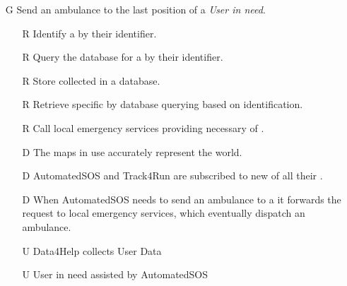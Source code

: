 \documentclass[../../../rasd.tex]{subfiles}
\begin{document}
\begin{itemize}
	\item[G\subs{7}]Send an ambulance to the last position of a \textit{User in need}.
	\begin{itemize}
		\item[R\subs{6}]Identify a  by their identifier.
		\item[R\subs{7}]Query the database for a  by their identifier.
		\item[R\subs{11}]Store collected  in a database.
		\item[R\subs{12}]Retrieve specific  by database querying based on  identification.
		\item[R\subs{38}]Call local emergency services providing necessary  of .
		\\
		\item[D\subs{3}]The maps in use accurately represent the world.
		\item[D\subs{6}]AutomatedSOS and Track4Run are subscribed to new  of all their .
		\item[D\subs{7}]When AutomatedSOS needs to send an ambulance to a  it forwards the request to local emergency services, which eventually dispatch an ambulance.
		\\
		\item[U\subs{5}]Data4Help collects User Data
		\item[U\subs{12}]User in need assisted by AutomatedSOS
	\end{itemize}
\end{itemize}
\end{document}
